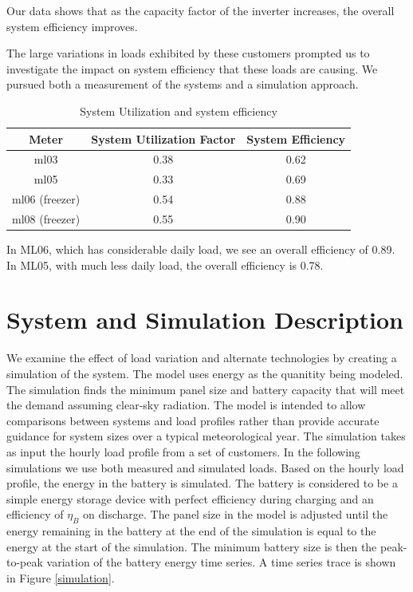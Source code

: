 \documentclass[conference]{IEEEtran}
\begin{document}
Our data shows that as the capacity factor of the inverter
increases, the overall system efficiency improves.

The large variations in loads exhibited by these customers prompted
us to investigate the impact on system efficiency that these
loads are causing.
We pursued both a measurement of the systems and a simulation approach.

\begin{table}
\centering
\begin{tabular}{c c c}
Meter & System Utilization Factor & System Efficiency \\
\hline
ml03 & 0.38 & 0.62 \\
ml05 & 0.33 & 0.69 \\
ml06 (freezer) & 0.54 & 0.88 \\
ml08 (freezer) & 0.55 & 0.90 \\
\end{tabular}
\caption{System Utilization and system efficiency}
\label{efficiency}
\end{table}

In ML06, which has considerable daily load, we see an overall
efficiency of 0.89.
In ML05, with much less daily load, the overall efficiency
is 0.78.

\section{System and Simulation Description}

We examine the effect of load variation and alternate technologies
by creating a simulation of the system.
The model uses energy as the quanitity being modeled.
The simulation finds the minimum panel size and battery capacity
that will meet the demand assuming clear-sky radiation.
The model is intended to allow comparisons between systems and
load profiles rather than provide accurate guidance for system
sizes over a typical meteorological year.
The simulation takes as input the hourly load profile from a
set of customers.
In the following simulations we use both measured and simulated
loads.
Based on the hourly load profile, the energy in the battery
is simulated.
The battery is considered to be a simple energy storage device
with perfect efficiency during charging and an efficiency of
$\eta_B$ on discharge.
The panel size in the model is adjusted until the energy remaining
in the battery at the end of the simulation is equal to the
energy at the start of the simulation.
The minimum battery size is then the peak-to-peak variation
of the battery energy time series.
A time series trace is shown in Figure \ref{simulation}.
\end{document}
